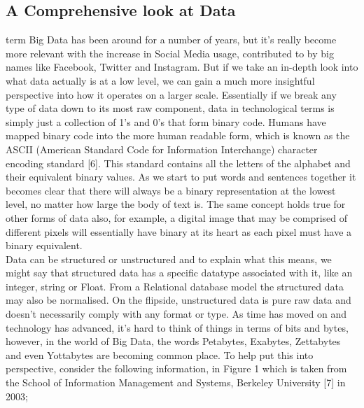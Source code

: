 \documentclass[10pt,journal,compsoc]{IEEEtran}
\begin{document}
\subsection{A Comprehensive look at Data}
 term Big Data has been around for a number of years, but it's really become more relevant with the increase in Social Media usage, contributed to by big names like Facebook, Twitter and Instagram. But if we take an in-depth look into what data actually is at a low level, we can gain a much more insightful perspective into how it operates on a larger scale. Essentially if we break any type of data down to its most raw component, data in technological terms is simply just a collection of 1's and 0's that form binary code. Humans have mapped binary code into the more human readable form, which is known as the ASCII (American Standard Code for Information Interchange) character encoding standard [6]. This standard contains all the letters of the alphabet and their equivalent binary values. As we start to put words and sentences together it becomes clear that there will always be a binary representation at the lowest level, no matter how large the body of text is. The same concept holds true for other forms of data also, for example, a digital image that may be comprised of different pixels will essentially have binary at its heart as each pixel must have a binary equivalent. \\  Data can be structured or unstructured and to explain what this means, we might say that structured data has a specific datatype associated with it, like an integer, string or Float. From a Relational database model the structured data may also be normalised. On the flipside, unstructured data is pure raw data and doesn't necessarily comply with any format or type. As time has moved on and technology has advanced, it's hard to think of things in terms of bits and bytes, however, in the world of Big Data, the words Petabytes, Exabytes, Zettabytes and even Yottabytes are becoming common place. To help put this into perspective, consider the following information, in Figure 1 which is taken from the School of Information Management and Systems, Berkeley University [7] in 2003;\\
\end{document}
